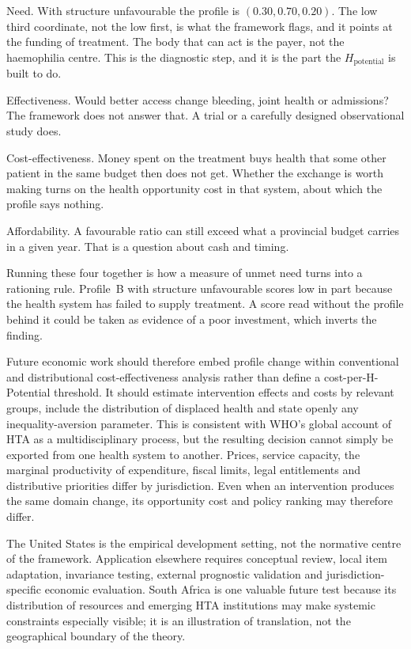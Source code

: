 \begin{reading}
Need. With structure unfavourable the profile is $(0.30,0.70,0.20)$. The low
third coordinate, not the low first, is what the framework flags, and it points
at the funding of treatment. The body that can act is the payer, not the
haemophilia centre. This is the diagnostic step, and it is the part the
$H_{\text{potential}}$ is built to do.

Effectiveness. Would better access change bleeding, joint health or
admissions? The framework does not answer that. A trial or a carefully
designed observational study does.

Cost-effectiveness. Money spent on the treatment buys health that some other
patient in the same budget then does not get. Whether the exchange is worth
making turns on the health opportunity cost in that system, about which the
profile says nothing.

Affordability. A favourable ratio can still exceed what a provincial budget
carries in a given year. That is a question about cash and timing.

Running these four together is how a measure of unmet need turns into a
rationing rule. Profile~B with structure unfavourable scores low in part
because the health system has failed to supply treatment. A score read without
the profile behind it could be taken as evidence of a poor investment, which
inverts the finding.
\end{reading}

Future economic work should therefore embed profile change within conventional
and distributional cost-effectiveness analysis rather than define a
cost-per-H-Potential threshold. It should estimate intervention effects and
costs by relevant groups, include the distribution of displaced health and
state openly any inequality-aversion parameter. \citep{asaria_2016_dcea} This is
consistent with WHO's global account of HTA as a multidisciplinary process, but
the resulting decision cannot simply be exported from one health system to
another. \citep{who_hta_2014,who_hta_institutional_2021} Prices, service
capacity, the marginal productivity of expenditure, fiscal limits, legal
entitlements and distributive priorities differ by jurisdiction. Even when an
intervention produces the same domain change, its opportunity cost and policy
ranking may therefore differ.

The United States is the empirical development setting, not the normative
centre of the framework. Application elsewhere requires conceptual review,
local item adaptation, invariance testing, external prognostic validation and
jurisdiction-specific economic evaluation. South Africa is one valuable future
test because its distribution of resources and emerging HTA institutions may
make systemic constraints especially visible; it is an illustration of
translation, not the geographical boundary of the theory.
\citep{south_africa_hta_2026}

